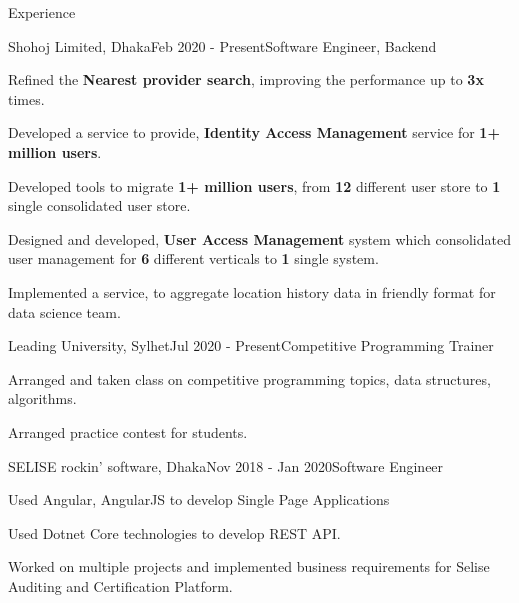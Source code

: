 \documentclass{resume}
\begin{document}
\begin{rSection}{Experience}

\begin{rSubsection}{Shohoj Limited, Dhaka}{Feb 2020 - Present}{Software Engineer, Backend}{}

\item Refined the \textbf{Nearest provider search}, improving the performance up to \textbf{3x} times.
\item Developed a service to provide, \textbf{Identity Access Management} service for \textbf{1+ million  users}.
\item Developed tools to migrate \textbf{1+ million users}, from \textbf{12} different user store to \textbf{1} single consolidated user store.
\item Designed and developed, \textbf{User Access Management} system which consolidated user management for \textbf{6} different verticals to \textbf{1} single system.
\item Implemented a service, to aggregate location history data in friendly format for data science team.
\end{rSubsection}

\begin{rSubsection}{Leading University, Sylhet}{Jul 2020 - Present}{Competitive Programming Trainer}{}
\item Arranged and taken class on competitive programming topics, data structures, algorithms.
\item Arranged practice contest for students.
\end{rSubsection}

\begin{rSubsection}{SELISE rockin' software, Dhaka}{Nov 2018 - Jan 2020}{Software Engineer}{}
\item Used Angular, AngularJS to develop Single Page Applications
\item Used Dotnet Core technologies to develop REST API.
\item Worked on multiple projects and implemented business requirements for Selise Auditing and Certification Platform.
\end{rSubsection}

\end{rSection}

\end{document}
